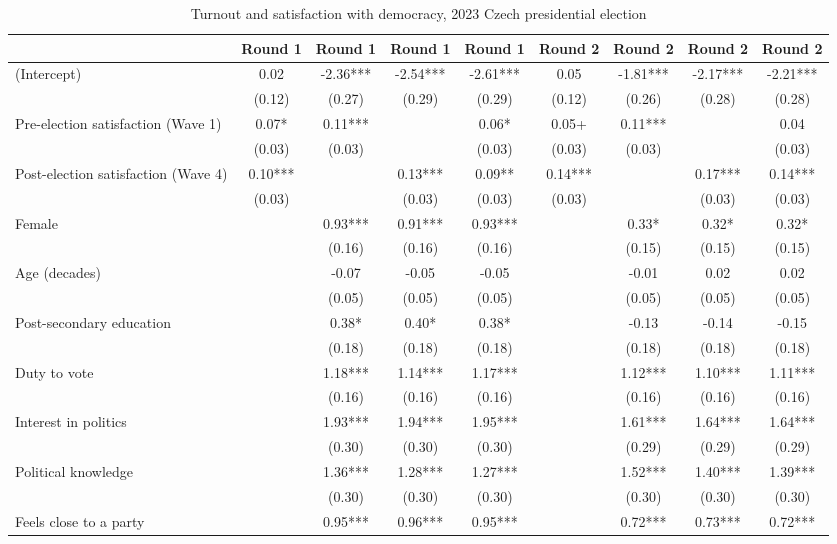 \begin{table}

\caption{Turnout and satisfaction with democracy, 2023 Czech presidential election}
\centering
\begin{tabular}[t]{lcccccccc}
\toprule
  & Round 1 & Round 1  & Round 1   & Round 1    & Round 2 & Round 2  & Round 2   & Round 2   \\
\midrule
(Intercept) & 0.02 & -2.36*** & -2.54*** & -2.61*** & 0.05 & -1.81*** & -2.17*** & -2.21***\\
 & (0.12) & (0.27) & (0.29) & (0.29) & (0.12) & (0.26) & (0.28) & (0.28)\\
Pre-election satisfaction (Wave 1) & 0.07* & 0.11*** &  & 0.06* & 0.05+ & 0.11*** &  & 0.04\\
 & (0.03) & (0.03) &  & (0.03) & (0.03) & (0.03) &  & (0.03)\\
Post-election satisfaction (Wave 4) & 0.10*** &  & 0.13*** & 0.09** & 0.14*** &  & 0.17*** & 0.14***\\
 & (0.03) &  & (0.03) & (0.03) & (0.03) &  & (0.03) & (0.03)\\
Female &  & 0.93*** & 0.91*** & 0.93*** &  & 0.33* & 0.32* & 0.32*\\
 &  & (0.16) & (0.16) & (0.16) &  & (0.15) & (0.15) & (0.15)\\
Age (decades) &  & -0.07 & -0.05 & -0.05 &  & -0.01 & 0.02 & 0.02\\
 &  & (0.05) & (0.05) & (0.05) &  & (0.05) & (0.05) & (0.05)\\
Post-secondary education &  & 0.38* & 0.40* & 0.38* &  & -0.13 & -0.14 & -0.15\\
 &  & (0.18) & (0.18) & (0.18) &  & (0.18) & (0.18) & (0.18)\\
Duty to vote &  & 1.18*** & 1.14*** & 1.17*** &  & 1.12*** & 1.10*** & 1.11***\\
 &  & (0.16) & (0.16) & (0.16) &  & (0.16) & (0.16) & (0.16)\\
Interest in politics &  & 1.93*** & 1.94*** & 1.95*** &  & 1.61*** & 1.64*** & 1.64***\\
 &  & (0.30) & (0.30) & (0.30) &  & (0.29) & (0.29) & (0.29)\\
Political knowledge &  & 1.36*** & 1.28*** & 1.27*** &  & 1.52*** & 1.40*** & 1.39***\\
 &  & (0.30) & (0.30) & (0.30) &  & (0.30) & (0.30) & (0.30)\\
Feels close to a party &  & 0.95*** & 0.96*** & 0.95*** &  & 0.72*** & 0.73*** & 0.72***\\

\end{tabular}
\end{table}

